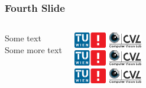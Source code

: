 \documentclass[xetex,professionalfont]{beamer}
\begin{document}

\begin{frame}
\frametitle{Fourth Slide}

\begin{columns}

Some text\\
Some more text


\begin{center}
\includegraphics[width=3cm]{tuwcvl.png}\\
\vspace{1cm}
\includegraphics[width=3cm]{tuwcvl.png}\\
\vspace{1cm}
\includegraphics[width=3cm]{tuwcvl.png}
\end{center}

\end{columns}

\end{frame}
\end{document}

